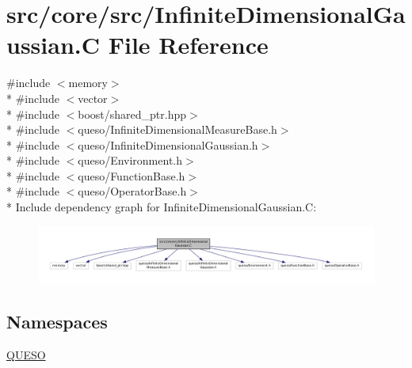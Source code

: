 \hypertarget{_infinite_dimensional_gaussian_8_c}{\section{src/core/src/\-Infinite\-Dimensional\-Gaussian.C File Reference}
\label{_infinite_dimensional_gaussian_8_c}
}
{\ttfamily \#include $<$memory$>$}\\*
{\ttfamily \#include $<$vector$>$}\\*
{\ttfamily \#include $<$boost/shared\-\_\-ptr.\-hpp$>$}\\*
{\ttfamily \#include $<$queso/\-Infinite\-Dimensional\-Measure\-Base.\-h$>$}\\*
{\ttfamily \#include $<$queso/\-Infinite\-Dimensional\-Gaussian.\-h$>$}\\*
{\ttfamily \#include $<$queso/\-Environment.\-h$>$}\\*
{\ttfamily \#include $<$queso/\-Function\-Base.\-h$>$}\\*
{\ttfamily \#include $<$queso/\-Operator\-Base.\-h$>$}\\*
Include dependency graph for Infinite\-Dimensional\-Gaussian.\-C\-:
\nopagebreak
\begin{figure}[H]
\begin{center}
\leavevmode
\includegraphics[width=350pt]{_infinite_dimensional_gaussian_8_c__incl}
\end{center}
\end{figure}
\subsection*{Namespaces}
\begin{DoxyCompactItemize}
\item 
\hyperlink{namespace_q_u_e_s_o}{Q\-U\-E\-S\-O}
\end{DoxyCompactItemize}
